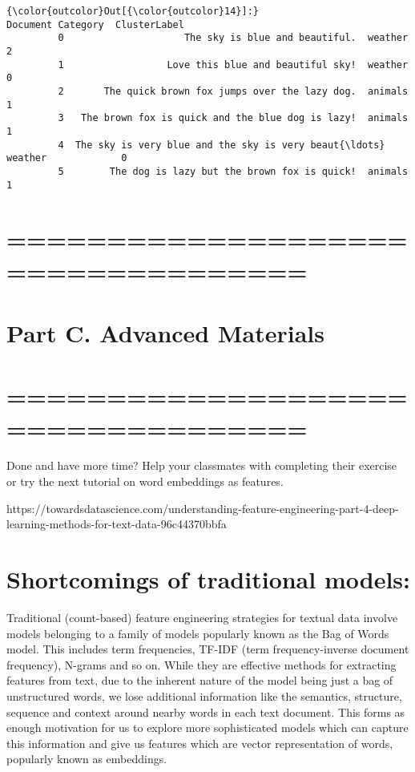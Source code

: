 \documentclass[11pt]{article}
\begin{document}
\begin{Verbatim}[commandchars=\\\{\}]
{\color{outcolor}Out[{\color{outcolor}14}]:}                                             Document Category  ClusterLabel
         0                     The sky is blue and beautiful.  weather             2
         1                  Love this blue and beautiful sky!  weather             0
         2       The quick brown fox jumps over the lazy dog.  animals             1
         3   The brown fox is quick and the blue dog is lazy!  animals             1
         4  The sky is very blue and the sky is very beaut{\ldots}  weather             0
         5        The dog is lazy but the brown fox is quick!  animals             1
\end{Verbatim}
            
    \hypertarget{section}{%
\section{===================================}\label{section}}

\hypertarget{part-c.-advanced-materials}{%
\section{Part C. Advanced Materials}\label{part-c.-advanced-materials}}

\hypertarget{section-1}{%
\section{===================================}\label{section-1}}

    Done and have more time? Help your classmates with completing their
exercise or try the next tutorial on word embeddings as features.

https://towardsdatascience.com/understanding-feature-engineering-part-4-deep-learning-methods-for-text-data-96c44370bbfa

    \hypertarget{shortcomings-of-traditional-models}{%
\section{Shortcomings of traditional
models:}\label{shortcomings-of-traditional-models}}

Traditional (count-based) feature engineering strategies for textual
data involve models belonging to a family of models popularly known as
the Bag of Words model. This includes term frequencies, TF-IDF (term
frequency-inverse document frequency), N-grams and so on. While they are
effective methods for extracting features from text, due to the inherent
nature of the model being just a bag of unstructured words, we lose
additional information like the semantics, structure, sequence and
context around nearby words in each text document. This forms as enough
motivation for us to explore more sophisticated models which can capture
this information and give us features which are vector representation of
words, popularly known as embeddings.
\end{document}
